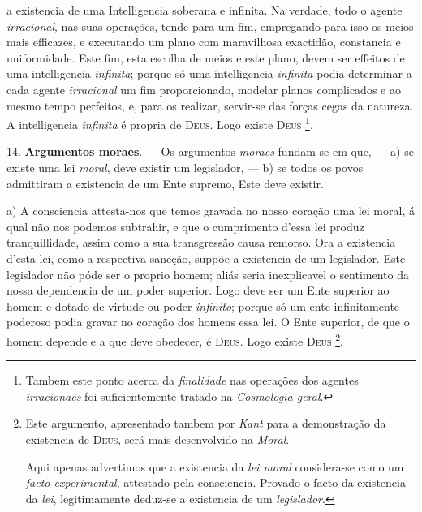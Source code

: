  a existencia de uma Intelligencia soberana e infinita. Na verdade, todo o agente \emph{irracional}, nas suas operações, tende para um fim, empregando para isso os meios mais efficazes, e executando um plano com maravilhosa exactidão, constancia e uniformidade. Este fim, esta escolha de meios e este plano, devem ser effeitos de uma intelligencia \emph{infinita}; porque só uma intelligencia \emph{infinita} podia determinar a cada agente \emph{irracional} um fim proporcionado, modelar planos complicados e ao mesmo tempo perfeitos, e, para os realizar, servir-se das forças cegas da natureza. A intelligencia \emph{infinita} é propria de \textsc{Deus}. Logo existe \textsc{Deus} \footnote{Tambem este ponto acerca da \emph{finalidade} nas operações dos agentes \emph{irracionaes} foi suficientemente tratado na \emph{Cosmologia geral}.}.

14. \textbf{Argumentos moraes}. --- Os argumentos \emph{moraes} fundam-se em que, --- a) se existe uma lei \emph{moral}, deve existir um legislador, --- b) se todos os povos admittiram a existencia de um Ente supremo, Este deve existir.

a) A consciencia attesta-nos que temos gravada no nosso coração uma lei moral, á qual não nos podemos subtrahir, e que o cumprimento d'essa lei produz tranquillidade, assim como a sua transgressão causa remorso. Ora a existencia d'esta lei, como a respectiva sancção, suppõe a existencia de um legislador. Este legislador não póde ser o proprio homem; aliás seria inexplicavel o sentimento da nossa dependencia de um poder superior. Logo deve ser um Ente superior ao homem e dotado de virtude ou poder \emph{infinito}; porque só um ente infinitamente poderoso podia gravar no coração dos homens essa lei. O Ente superior, de que o homem depende e a que deve obedecer, é \textsc{Deus}. Logo existe \textsc{Deus} \footnote{Este argumento, apresentado tambem por \emph{Kant} para a demonstração da existencia de \textsc{Deus}, será mais desenvolvido na \emph{Moral}.\par Aqui apenas advertimos que a existencia da \emph{lei moral} considera-se como um \emph{facto experimental}, attestado pela consciencia. Provado o facto da existencia da \emph{lei}, legitimamente deduz-se a existencia de um \emph{legislador}.}.

